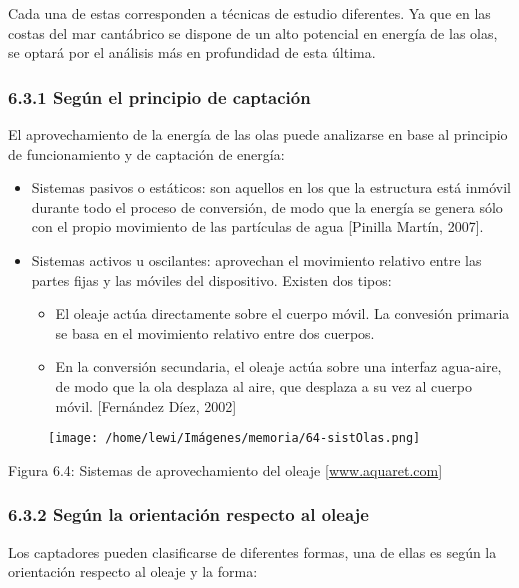 \documentclass[]{article}
\begin{document}
Cada una de estas corresponden a técnicas de estudio diferentes. Ya que
en las costas del mar cantábrico se dispone de un alto potencial en
energía de las olas, se optará por el análisis más en profundidad de
esta última.

\subsubsection{6.3.1 Según el principio de captación}\label{header-n85}

El aprovechamiento de la energía de las olas puede analizarse en base al
principio de funcionamiento y de captación de energía:

\begin{itemize}
\item
  Sistemas pasivos o estáticos: son aquellos en los que la estructura
  está inmóvil durante todo el proceso de conversión, de modo que la
  energía se genera sólo con el propio movimiento de las partículas de
  agua {[}Pinilla Martín, 2007{]}. 
\item
  Sistemas activos u oscilantes: aprovechan el movimiento relativo entre
  las partes fijas y las móviles del dispositivo. Existen dos tipos:

  \begin{itemize}
  \item
    El oleaje actúa directamente sobre el cuerpo móvil. La convesión
    primaria se basa en el movimiento relativo entre dos cuerpos.
  \item
    En la conversión secundaria, el oleaje actúa sobre una interfaz
    agua-aire, de modo que la ola desplaza al aire, que desplaza a su
    vez al cuerpo móvil. {[}Fernández Díez, 2002{]} 
  \end{itemize}
\end{itemize}

\begin{figure}
\centering
\texttt{[image: /home/lewi/Imágenes/memoria/64-sistOlas.png]}
\caption{}
\end{figure}

Figura 6.4: Sistemas de aprovechamiento del oleaje
{[}\url{www.aquaret.com}{]}

\subsubsection{6.3.2 Según la orientación respecto al
oleaje}\label{header-n106}

Los captadores pueden clasificarse de diferentes formas, una de ellas es
según la orientación respecto al oleaje y la forma:
\end{document}

